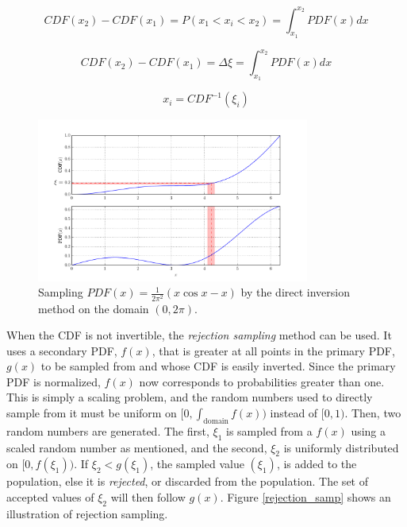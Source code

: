 \begin{equation}
\label{CDF_property1}
CDF(x_2) - CDF(x_1) = P( x_1 < x_i < x_2) = \int_{x_1}^{x_2} PDF(x) dx
\end{equation}

\begin{equation}
\label{CDF_property2}
CDF(x_2) - CDF(x_1) = \Delta \xi =  \int_{x_1}^{x_2} PDF(x) dx
\end{equation}

\begin{equation}
\label{CDF_inversion}
 x_i = CDF^{-1}(\xi_i)
\end{equation}

\begin{figure}[h!] 
  \centering
    \includegraphics[width=0.8\textwidth]{graphics/direct_samp.pdf}
     \caption{Sampling $PDF(x)=\frac{1}{2\pi^2}(x \cos x - x)$ by the direct inversion method on the domain $(0,2\pi)$. \label{direct_samp}}
\end{figure}

When the CDF is not invertible, the \emph{rejection sampling} method can be used.  It uses a secondary PDF, $f(x)$, that is greater at all points in the primary PDF, $g(x)$ to be sampled from and whose CDF is easily inverted.  Since the primary PDF is normalized, $f(x)$ now corresponds to probabilities greater than one.  This is simply a scaling problem, and the random numbers used to directly sample from it must be uniform on $[0,\int_\mathrm{domain}f(x))$ instead of $[0,1)$.   Then, two random numbers are generated.  The first, $\xi_1$ is sampled from a $f(x)$ using a scaled random number as mentioned, and the second, $\xi_2$ is uniformly distributed on $[0,f(\xi_1))$.  If $\xi_2 < g(\xi_1)$, the sampled value $(\xi_1)$, is added to the population, else it is \emph{rejected}, or discarded from the population.  The set of accepted values of ${\xi_2}$ will then follow $g(x)$.  Figure \ref{rejection_samp} shows an illustration of rejection sampling. %

